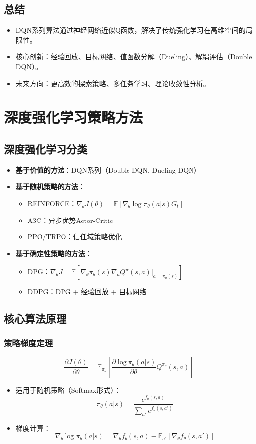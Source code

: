 \subsection{总结}
\begin{itemize}
    \item DQN系列算法通过神经网络近似Q函数，解决了传统强化学习在高维空间的局限性。
    \item 核心创新：经验回放、目标网络、值函数分解（Dueling）、解耦评估（Double DQN）。
    \item 未来方向：更高效的探索策略、多任务学习、理论收敛性分析。
\end{itemize}

\section{深度强化学习策略方法}
\subsection{深度强化学习分类}
\begin{itemize}
    \item \textbf{基于价值的方法}：DQN系列（Double DQN, Dueling DQN）
    \item \textbf{基于随机策略的方法}：
    \begin{itemize}
        \item REINFORCE：$\nabla_\theta J(\theta) = \mathbb{E}[\nabla_\theta \log \pi_\theta(a|s) G_t]$
        \item A3C：异步优势Actor-Critic
        \item PPO/TRPO：信任域策略优化
    \end{itemize}
    \item \textbf{基于确定性策略的方法}：
    \begin{itemize}
        \item DPG：$\nabla_\theta J = \mathbb{E}[\nabla_\theta \pi_\theta(s) \nabla_a Q^w(s,a)|_{a=\pi_\theta(s)}]$
        \item DDPG：DPG + 经验回放 + 目标网络
    \end{itemize}
\end{itemize}

\subsection{核心算法原理}
\subsubsection{策略梯度定理}
\[
\frac{\partial J(\theta)}{\partial \theta} = \mathbb{E}_{\pi_\theta}\left[\frac{\partial \log \pi_\theta(a|s)}{\partial \theta} Q^{\pi_\theta}(s,a)\right]
\]
\begin{itemize}
    \item 适用于随机策略（Softmax形式）：
    \[
    \pi_\theta(a|s) = \frac{e^{f_\theta(s,a)}}{\sum_{a'} e^{f_\theta(s,a')}}
    \]
    \item 梯度计算：
    \[
    \nabla_\theta \log \pi_\theta(a|s) = \nabla_\theta f_\theta(s,a) - \mathbb{E}_{a'}[\nabla_\theta f_\theta(s,a')]
    \]
\end{itemize}

